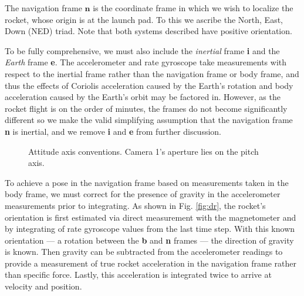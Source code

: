 \documentclass{article}
\begin{document}
The navigation frame $\textbf{n}$ is the coordinate frame in which we wish to localize the rocket, whose origin is at the launch pad. To this we ascribe the North, East, Down (NED) triad. Note that both systems described have positive orientation. 

To be fully comprehensive, we must also include the \textit{inertial} frame \textbf{i} and the \textit{Earth} frame \textbf{e}. The accelerometer and rate gyroscope take measurements with respect to the inertial frame rather than the navigation frame or body frame, and thus the effects of Coriolis acceleration caused by the Earth's rotation and body acceleration caused by the Earth's orbit may be factored in. However, as the rocket flight is on the order of minutes, the frames do not become significantly different so we make the valid simplifying assumption that the navigation frame \textbf{n} is inertial, and we remove \textbf{i} and \textbf{e} from further discussion.

\begin{figure}[htbp]%
    \centering
    \caption{Attitude axis conventions. Camera 1's aperture lies on the pitch axis.}%
    \label{fig:axes}
\end{figure}

To achieve a pose in the navigation frame based on measurements taken in the body frame, we must correct for the presence of gravity in the accelerometer measurements prior to integrating. As shown in Fig. \ref{fig:dr}, the rocket's orientation is first estimated via direct measurement with the magnetometer and by integrating of rate gyroscope values from the last time step. With this known orientation — a rotation between the \textbf{b} and \textbf{n} frames — the direction of gravity is known. Then gravity can be subtracted from the accelerometer readings to provide a measurement of true rocket acceleration in the navigation frame rather than specific force. Lastly, this acceleration is integrated twice to arrive at velocity and position.
\end{document}

